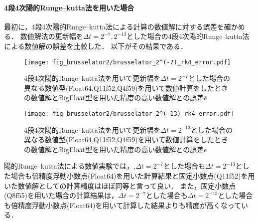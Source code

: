 \paragraph*{4段4次陽的Runge--kutta法を用いた場合}
最初に，4段4次陽的Runge--kutta法による計算の数値解に対する誤差を確かめる．
数値解法の更新幅を$\Delta t = 2^{-7},2^{-13}$とした場合の4段4次陽的Runge--kutta法による数値解の誤差を比較した．
以下がその結果である．
\begin{figure}[H]
    \centering
    \begin{minipage}[b]{0.48\columnwidth}
        \centering
        \texttt{[image: fig\_brusselator2/brusselator\_2^(-7)\_rk4\_error.pdf]}
        \caption{4段4次陽的Runge--kutta法を用いて更新幅を$\Delta t = 2^{-7}$とした場合の異なる数値型(Float64,Q11f52,Q4f59)を用いて数値計算をしたときの数値解とBigFloat型を用いた精度の高い数値解との誤差$\bar{e}$}
        \label{fig:brusselator_2^(-7)_rk4_error}
    \end{minipage}
    \hspace{0.01\columnwidth}
    \begin{minipage}[b]{0.48\columnwidth}
        \centering
        \texttt{[image: fig\_brusselator2/brusselator\_2^(-13)\_rk4\_error.pdf]}
        \caption{4段4次陽的Runge--kutta法を用いて更新幅を$\Delta t =  2^{-13}$とした場合の異なる数値型(Float64,Q11f52,Q4f59)を用いて数値計算をしたときの数値解とBigFloat型を用いた精度の高い数値解との誤差$\bar{e}$}
        \label{fig:brusselator_2^(-13)_rk4_error}
    \end{minipage}
\end{figure}
陽的Runge--kutta法による数値実験では，,$\Delta t = 2^{-7}$とした場合も$\Delta t =  2^{-13}$とした場合も倍精度浮動小数点(Float64)を用いた計算結果と固定小数点(Q11f52)を用いた数値解としての計算精度はほぼ同等と言って良い．
また，固定小数点(Q8f55)を用いた場合の計算結果は，$\Delta t = 2^{-7}$とした場合も$\Delta t =  2^{-13}$とした場合も倍精度浮動小数点(Float64)を用いて計算した結果よりも精度が高くなっている．



